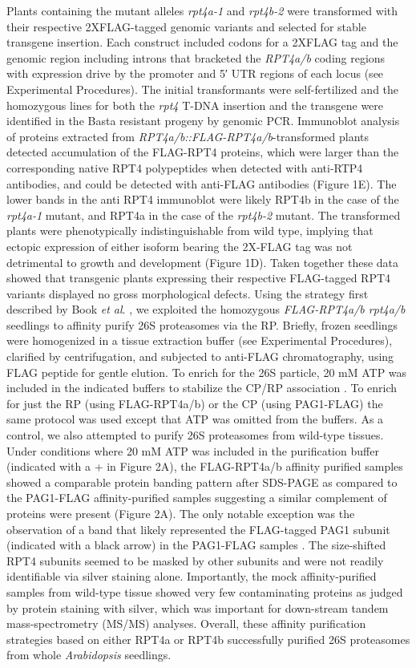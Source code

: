 Plants containing the mutant alleles \textit{rpt4a-1} and \textit{rpt4b-2} were transformed with their respective 2XFLAG-tagged genomic variants and selected for stable transgene insertion. Each construct included codons for a 2XFLAG tag and the genomic region including introns that bracketed the \textit{RPT4a/b} coding regions with expression drive by the promoter and 5′ UTR regions of each locus (see Experimental Procedures). The initial transformants were self-fertilized and the homozygous lines for both the \textit{rpt4} T-DNA insertion and the transgene were identified in the Basta resistant progeny by genomic PCR.  Immunoblot analysis of proteins extracted from \textit{RPT4a/b::FLAG-RPT4a/b}-transformed plants detected accumulation of the FLAG-RPT4 proteins, which were larger than the corresponding native RPT4 polypeptides when detected with anti-RTP4 antibodies, and could be detected with anti-FLAG antibodies (Figure 1E).  The lower bands in the anti RPT4 immunoblot were likely RPT4b in the case of the \textit{rpt4a-1} mutant, and RPT4a in the case of the \textit{rpt4b-2} mutant. The transformed plants were phenotypically indistinguishable from wild type, implying that ectopic expression of either isoform bearing the 2X-FLAG tag was not detrimental to growth and development (Figure 1D).  Taken together these data showed that transgenic plants expressing their respective FLAG-tagged RPT4 variants displayed no gross morphological defects.
	Using the strategy first described by Book \textit{et al}. \citep{book10}, we exploited the homozygous \textit{FLAG-RPT4a/b rpt4a/b} seedlings to affinity purify 26S proteasomes via the RP. Briefly, frozen seedlings were homogenized in a tissue extraction buffer (see Experimental Procedures), clarified by centrifugation, and subjected to anti-FLAG chromatography, using FLAG peptide for gentle elution.  To enrich for the 26S particle, 20 mM ATP was included in the indicated buffers to stabilize the CP/RP association \citep{book10, liu06}. To enrich for just the RP (using FLAG-RPT4a/b) or the CP (using PAG1-FLAG) the same protocol was used except that ATP was omitted from the buffers. As a control, we also attempted to purify 26S proteasomes from wild-type tissues.  Under conditions where 20 mM ATP was included in the purification buffer (indicated with a + in Figure 2A), the FLAG-RPT4a/b affinity purified samples showed a comparable protein banding pattern after SDS-PAGE as compared to the PAG1-FLAG affinity-purified samples suggesting a similar complement of proteins were present (Figure 2A). The only notable exception was the observation of a band that likely represented the FLAG-tagged PAG1 subunit (indicated with a black arrow) in the PAG1-FLAG samples \citep{book10}. The size-shifted RPT4 subunits seemed to be masked by other subunits and were not readily identifiable via silver staining alone. Importantly, the mock affinity-purified samples from wild-type tissue showed very few contaminating proteins as judged by protein staining with silver, which was important for down-stream tandem mass-spectrometry (MS/MS) analyses. Overall, these affinity purification strategies based on either RPT4a or RPT4b successfully purified 26S proteasomes from whole \textit{Arabidopsis} seedlings.
